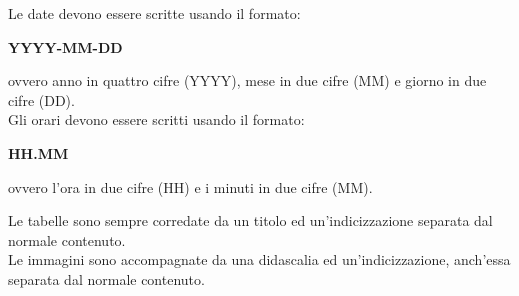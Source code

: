         Le date devono essere scritte usando il formato:
        \begin{center}
          \textbf{YYYY-MM-DD}
        \end{center}
        ovvero anno in quattro cifre (YYYY), mese in due cifre (MM) e giorno in due cifre (DD).\\
        Gli orari devono essere scritti usando il formato:
        \begin{center}
          \textbf{HH.MM}
        \end{center}
        ovvero l'ora in due cifre (HH) e i minuti in due cifre (MM).

        Le tabelle sono sempre corredate da un titolo ed un'indicizzazione separata dal normale contenuto.\\
        Le immagini sono accompagnate da una didascalia ed un'indicizzazione, anch'essa separata dal normale contenuto.

